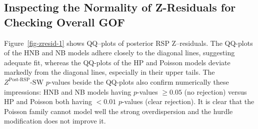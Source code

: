 \documentclass[
  english,
  letterpaper,
  DIV=11,
  numbers=noendperiod]{scrartcl}
\newenvironment{Shaded}{\begin{snugshade}}{\end{snugshade}}
\newcommand{\NormalTok}[1]{\textcolor[rgb]{0.00,0.23,0.31}{#1}}
\newcommand{\OtherTok}[1]{\textcolor[rgb]{0.00,0.23,0.31}{#1}}
\newcommand{\SpecialCharTok}[1]{\textcolor[rgb]{0.37,0.37,0.37}{#1}}
\begin{document}
\begin{Shaded}
\end{Shaded}

\subsection{Inspecting the Normality of Z-Residuals for Checking Overall
GOF}\label{inspecting-the-normality-of-z-residuals-for-checking-overall-gof}

Figure~\ref{fig-zresid-1} shows QQ--plots of posterior RSP Z--residuals.
The QQ-plots of the HNB and NB models adhere closely to the diagonal
lines, suggesting adequate fit, whereas the QQ-plots of the HP and
Poisson models deviate markedly from the diagonal lines, especially in
their upper tails. The \(Z^{\text{Post-RSP}}\text{-SW}\) \(p\)-values
beside the QQ-plots also confirm numerically these impressions: HNB and
NB models having \(p\)-values \(\geq 0.05\) (no rejection) versus HP and
Poisson both having \(<0.01\) \(p\)-values (clear rejection). It is
clear that the Poisson family cannot model well the strong
overdispersion and the hurdle modification does not improve it.
\end{document}
